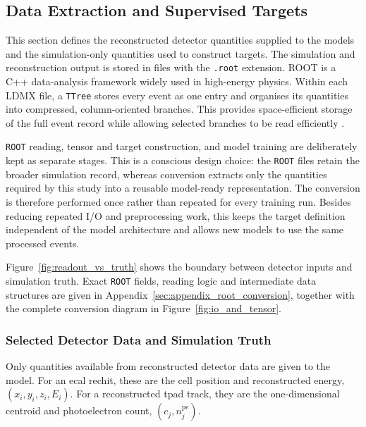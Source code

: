 \subsection{Data Extraction and Supervised Targets}
\label{sec:method_processing}

This section defines the reconstructed detector quantities supplied to the
models and the simulation-only quantities used to construct targets. The
simulation and reconstruction output is stored in files with the
\texttt{.root} extension. ROOT is a C++ data-analysis framework widely used in
high-energy physics. Within each LDMX file, a \texttt{TTree} stores every
event as one entry and organises its quantities into compressed,
column-oriented branches. This provides space-efficient storage of the full
event record while allowing selected branches to be read efficiently
\cite{ROOT_NIMA_1997,root_about,root_ttree}.

\texttt{ROOT} reading, tensor and target construction, and model training are
deliberately kept as separate stages. This is a conscious design choice: the
\texttt{ROOT} files retain the broader simulation record, whereas conversion
extracts only the quantities required by this study into a reusable
model-ready representation. The conversion is therefore performed once rather
than repeated for every training run. Besides reducing repeated I/O and
preprocessing work, this keeps the target definition independent of the model
architecture and allows new models to use the same processed events.

Figure~\ref{fig:readout_vs_truth} shows the boundary between detector inputs
and simulation truth. Exact \texttt{ROOT} fields, reading logic and
intermediate data structures are given in
Appendix~\ref{sec:appendix_root_conversion}, together with the complete
conversion diagram in Figure~\ref{fig:io_and_tensor}.



\subsubsection{Selected Detector Data and Simulation Truth}

Only quantities available from reconstructed detector data are given to the
model. For an \gls{ecal} \gls{rechit}, these are the cell position and reconstructed
energy, \((x_i,y_i,z_i,E_i)\). For a reconstructed \gls{tpad} track, they are
the one-dimensional centroid and photoelectron count,
\((c_j,n_j^{\mathrm{pe}})\).


